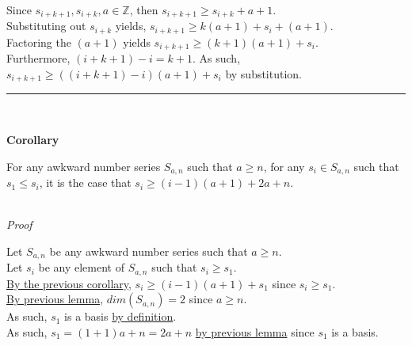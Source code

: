 \documentclass[a4paper,12pt]{article}
\begin{document}
\noindent Since $s_{i + k + 1}, s_{i + k}, a \in \mathbb{Z}$, then $s_{i + k + 1} \geq s_{i + k} + a + 1$.\\

\noindent Substituting out $s_{i + k}$ yields, $s_{i + k + 1} \geq k(a + 1) + s_i + (a + 1)$.\\

\noindent Factoring the $(a + 1)$ yields $s_{i + k + 1} \geq (k + 1)(a + 1) + s_i$.\\

\noindent Furthermore, $(i + k + 1) - i = k + 1$. As such, $s_{i + k + 1} \geq ((i + k + 1) - i)(a + 1) + s_i$ by substitution.

\begin{center}
\noindent\rule{8cm}{0.4pt}
\end{center}
\noindent \\






\label{corollary:min_length_one_staple_pt2}
\hypertarget{corollary:min_length_one_staple_pt2}{}
\begin{tcolorbox}
\textbf{Corollary}

\noindent For any awkward number series $S_{a,n}$ such that $a \geq n$, for any $s_i \in S_{a, n}$ such that $s_1 \leq s_i$, it is the case that $s_i \geq (i - 1)(a + 1) + 2a + n$.

\end{tcolorbox}

\noindent \\
\textit{Proof}

\noindent Let $S_{a, n}$ be any awkward number series such that $a \geq n$.\\

\noindent Let $s_i$ be any element of $S_{a, n}$ such that $s_i \geq s_1$.\\

\noindent \hyperlink{corollary:min_length_one_staple_pt2}{By the previous corollary}, $s_i \geq (i - 1)(a + 1) + s_1$ since $s_i \geq s_1$.\\

\noindent \hyperlink{lemma:dimension_a_greater_equal_n}{By previous lemma}, $dim(S_{a, n}) = 2$ since $a \geq n$.\\

\noindent As such, $s_1$ is a basis \hyperlink{definition:basis}{by definition}.\\

\noindent As such, $s_1 = (1 + 1)a + n = 2a + n$ \hyperlink{lemma:basis_lengths}{by previous lemma} since $s_1$ is a basis.\\
\end{document}
